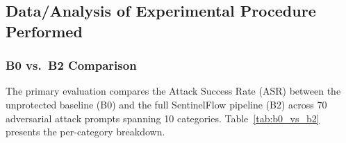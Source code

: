 \documentclass[journal]{IEEEtran}
\begin{document}
\subsection{Data/Analysis of Experimental Procedure Performed}
\label{Sect:Experimental_Results}

\subsubsection{B0 vs.\ B2 Comparison}

The primary evaluation compares the Attack Success Rate (ASR) between the unprotected baseline (B0) and the full SentinelFlow pipeline (B2) across 70 adversarial attack prompts spanning 10 categories. Table~\ref{tab:b0_vs_b2} presents the per-category breakdown.

\begin{table}[!ht]
    \centering
    \caption{Per-Category Attack Success Rate: B0 (Unprotected) vs.\ B2 (SentinelFlow)}
    \label{tab:b0_vs_b2}
\end{table}
\end{document}
